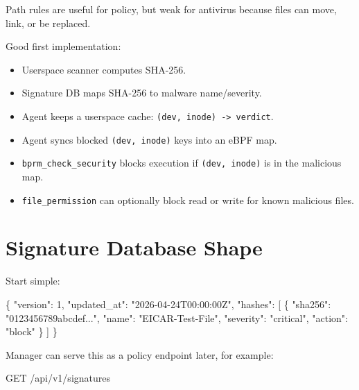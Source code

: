 \documentclass[
  12pt,
]{report}
\newenvironment{Shaded}{}{}
\newcommand{\DataTypeTok}[1]{\textcolor[rgb]{0.56,0.13,0.00}{#1}}
\newcommand{\DecValTok}[1]{\textcolor[rgb]{0.25,0.63,0.44}{#1}}
\newcommand{\FunctionTok}[1]{\textcolor[rgb]{0.02,0.16,0.49}{#1}}
\newcommand{\NormalTok}[1]{#1}
\newcommand{\OtherTok}[1]{\textcolor[rgb]{0.00,0.44,0.13}{#1}}
\newcommand{\StringTok}[1]{\textcolor[rgb]{0.25,0.44,0.63}{#1}}
\providecommand{\tightlist}{%
  \setlength{\itemsep}{0pt}\setlength{\parskip}{0pt}}
\begin{document}
Path rules are useful for policy, but weak for antivirus because files
can move, link, or be replaced.

Good first implementation:

\begin{itemize}
\tightlist
\item
  Userspace scanner computes SHA-256.
\item
  Signature DB maps SHA-256 to malware name/severity.
\item
  Agent keeps a userspace cache:
  \texttt{(dev,\ inode)\ -\textgreater{}\ verdict}.
\item
  Agent syncs blocked \texttt{(dev,\ inode)} keys into an eBPF map.
\item
  \texttt{bprm\_check\_security} blocks execution if
  \texttt{(dev,\ inode)} is in the malicious map.
\item
  \texttt{file\_permission} can optionally block read or write for known
  malicious files.
\end{itemize}

\section{Signature Database Shape}\label{signature-database-shape}

Start simple:

\begin{Shaded}
\begin{Highlighting}[]
\FunctionTok{\{}
  \DataTypeTok{"version"}\FunctionTok{:} \DecValTok{1}\FunctionTok{,}
  \DataTypeTok{"updated\_at"}\FunctionTok{:} \StringTok{"2026{-}04{-}24T00:00:00Z"}\FunctionTok{,}
  \DataTypeTok{"hashes"}\FunctionTok{:} \OtherTok{[}
    \FunctionTok{\{}
      \DataTypeTok{"sha256"}\FunctionTok{:} \StringTok{"0123456789abcdef..."}\FunctionTok{,}
      \DataTypeTok{"name"}\FunctionTok{:} \StringTok{"EICAR{-}Test{-}File"}\FunctionTok{,}
      \DataTypeTok{"severity"}\FunctionTok{:} \StringTok{"critical"}\FunctionTok{,}
      \DataTypeTok{"action"}\FunctionTok{:} \StringTok{"block"}
    \FunctionTok{\}}
  \OtherTok{]}
\FunctionTok{\}}
\end{Highlighting}
\end{Shaded}

Manager can serve this as a policy endpoint later, for example:

\begin{Shaded}
\begin{Highlighting}[]
\NormalTok{GET /api/v1/signatures}
\end{Highlighting}
\end{Shaded}
\end{document}
